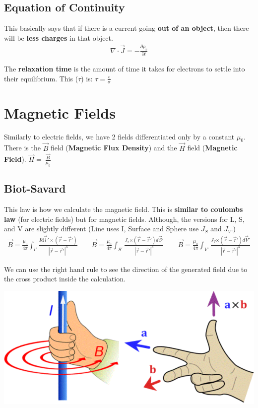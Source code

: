 \documentclass[12pt,letterpaper]{article} \usepackage{amsmath} \usepackage{graphicx} \usepackage[margin=1in]{geometry} \usepackage{longtable}  \usepackage{amssymb}
\begin{document}
	\subsection{Equation of Continuity}
	This basically says that if there is a current going \textbf{out of an object}, then there will be \textbf{less charges} in that object. 
	\begin{align*}
		\nabla \cdot \vec J = -\frac{\partial \rho_v}{\partial t}
	\end{align*}

	The\textbf{ relaxation time }is the amount of time it takes for electrons to settle into their equilibrium. This ($\tau$) is: $\tau = \frac{\epsilon}{\sigma}$
	
	\section{Magnetic Fields}
	Similarly to electric fields, we have 2 fields differentiated only by a constant $\mu_0$. There is the $\vec B$ field (\textbf{Magnetic Flux Density}) and the $\vec H$ field (\textbf{Magnetic Field}). $\vec H = \ \frac{\vec B}{\mu_0}$
	
	\subsection{Biot-Savard}
	This law is how we calculate the magnetic field. This is \textbf{similar to coulombs law} (for electric fields) but for magnetic fields. Although, the versions for L, S, and V are slightly different (Line uses I, Surface and Sphere use $J_S$ and $J_V$.)
	\begin{align*}
		\vec B = \frac{\mu_0}{4\pi}\int_{l\prime}\frac{I\mathrm d \vec l\prime \times (\vec r - \vec r\prime)}{|\vec r - \vec r\prime |^3} \qquad \vec B = \frac{\mu_0}{4\pi}\int_{S\prime}\frac{J_s\mathrm \times (\vec r - \vec r\prime)d \vec S\prime}{|\vec r - \vec r\prime |^3} \qquad \vec B = \frac{\mu_0}{4\pi}\int_{V\prime}\frac{J_V\mathrm \times (\vec r - \vec r\prime)d \vec V\prime}{|\vec r - \vec r\prime |^3}
	\end{align*}

	We can use the right hand rule to see the direction of the generated field due to the cross product inside the calculation. 
	\begin{center}
		\includegraphics[width=0.7\linewidth]{rhr}
	\end{center}
\end{document}
